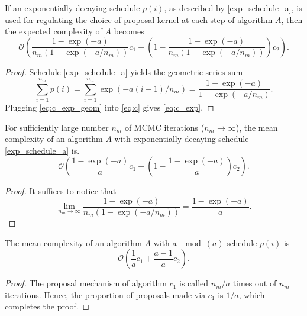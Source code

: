 \documentclass[twoside,11pt]{article}
\begin{document}
{\begin{proposition}
If an exponentially decaying schedule $p(i)$, as described by \eqref{exp_schedule_a}, is used for regulating the choice of 
proposal kernel at each step of algorithm $A$, then the expected complexity of $A$ becomes
\begin{equation}
\label{eq:c_exp}
\mathcal{O}\left(
\dfrac{1-\exp{(-a)}}{n_m(1-\exp{(-a/n_m)})}c_1+
\left(1-\dfrac{1-\exp{(-a)}}{n_m(1-\exp{(-a/n_m)})}\right)c_2
\right).
\end{equation}
\end{proposition}

\begin{proof}
Schedule \eqref{exp_schedule_a} yields the geometric series sum
\begin{equation}
\label{eq:c_exp_geom}
\sum_{i=1}^{n_m}p(i)=
\sum_{i=1}^{n_m}\exp{(-a(i-1)/n_m)}=
\dfrac{1-\exp{(-a)}}{1-\exp{(-a/n_m)}}.
\end{equation}
Plugging \eqref{eq:c_exp_geom} into \eqref{eq:c} gives \eqref{eq:c_exp}.
\end{proof}

\begin{lemma}
For sufficiently large number $n_m$ of MCMC iterations ($n_m\rightarrow\infty$), the mean complexity of an algorithm $A$ 
with exponentially decaying schedule \eqref{exp_schedule_a} is.
\begin{equation}
\label{eq:c_exp_limit}
\mathcal{O}\left(
\dfrac{1-\exp{(-a)}}{a}c_1+
\left(1-\dfrac{1-\exp{(-a)}}{a}\right)c_2
\right).
\end{equation}
\end{lemma}

\begin{proof}
It suffices to notice that
\begin{equation}
\lim_{n_m\to\infty}\dfrac{1-\exp{(-a)}}{n_m(1-\exp{(-a/n_m)})}=\dfrac{1-\exp{(-a)}}{a}.
\end{equation}
\end{proof}

\begin{proposition}
The mean complexity of an algorithm $A$ with a $\mod{(a)}$ schedule $p(i)$ is
\begin{equation}
\label{eq:c_mod}
\mathcal{O}\left(
\dfrac{1}{a}c_1+
\dfrac{a-1}{a} c_2
\right).
\end{equation}
\end{proposition}

\begin{proof}
The proposal mechanism of algorithm $c_1$ is called $n_m/a$ times out of $n_m$ iterations. Hence, the proportion of proposals
made via $c_1$ is $1/a$, which completes the proof.
\end{proof}

}
\end{document}
